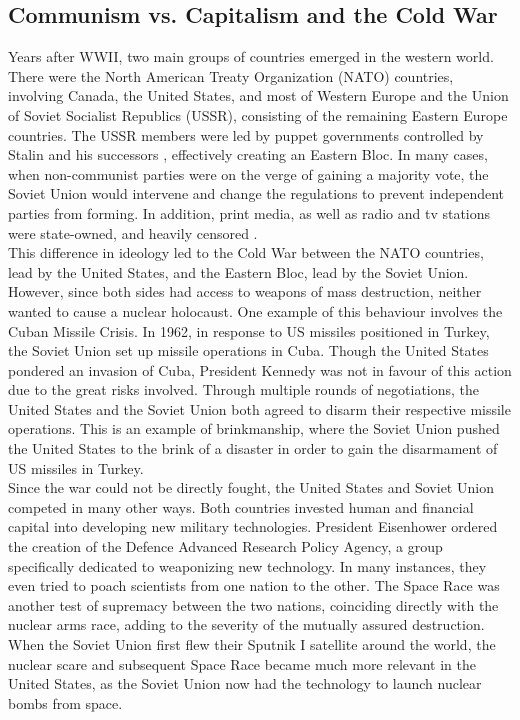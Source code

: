 \documentclass[12pt]{article}
\begin{document}
\subsection{Communism vs. Capitalism and the Cold War}

Years after WWII, two main groups of countries emerged in the western world. There were the North American Treaty Organization (NATO) countries, involving Canada, the United States, and most of Western Europe\cite{13} and the Union of Soviet Socialist Republics (USSR), consisting of the remaining Eastern Europe countries. The USSR members were led by puppet governments controlled by Stalin and his successors , effectively creating an Eastern Bloc\cite{13}. In many cases, when non-communist parties were on the verge of gaining a majority vote, the Soviet Union would intervene and change the regulations to prevent independent parties from forming. In addition, print media, as well as radio and tv stations were state-owned, and heavily censored \cite{14}.\\

This difference in ideology led to the Cold War between the NATO countries, lead by the United States, and the Eastern Bloc, lead by the Soviet Union. However, since both sides had access to weapons of mass destruction, neither wanted to cause a nuclear holocaust. One example of this behaviour involves the Cuban Missile Crisis. In 1962, in response to US missiles positioned in Turkey, the Soviet Union set up missile operations in Cuba\cite{15}. Though the United States pondered an invasion of Cuba, President Kennedy was not in favour of this action due to the great risks involved. Through multiple rounds of negotiations, the United States and the Soviet Union both agreed to disarm their respective missile operations\cite{15}. This is an example of brinkmanship, where the Soviet Union pushed the United States to the brink of a disaster in order to gain the disarmament of US missiles in Turkey\cite{15}.\\

Since the war could not be directly fought, the United States and Soviet Union competed in many other ways. Both countries invested human and financial capital into developing new military technologies. President Eisenhower ordered the creation of the Defence Advanced Research Policy Agency, a group specifically dedicated to weaponizing new technology\cite{16}. In many instances, they even tried to poach scientists from one nation to the other. The Space Race was another test of supremacy between the two nations, coinciding directly with the nuclear arms race, adding to the severity of the mutually assured destruction. When the Soviet Union first flew their Sputnik I satellite around the world, the nuclear scare and subsequent Space Race became much more relevant in the United States, as the Soviet Union now had the technology to launch nuclear bombs from space\cite{17}.\\
\end{document}
